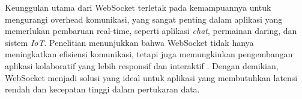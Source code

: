Keunggulan utama dari WebSocket terletak pada kemampuannya untuk mengurangi overhead komunikasi, yang sangat penting dalam aplikasi yang memerlukan pembaruan real-time, seperti aplikasi \emph{chat}, permainan daring, dan sistem \emph{IoT}. Penelitian menunjukkan bahwa WebSocket tidak hanya meningkatkan efisiensi komunikasi, tetapi juga memungkinkan pengembangan aplikasi kolaboratif yang lebih responsif dan interaktif \cite{Milsap2019}. Dengan demikian, WebSocket menjadi solusi yang ideal untuk aplikasi yang membutuhkan latensi rendah dan kecepatan tinggi dalam pertukaran data.
